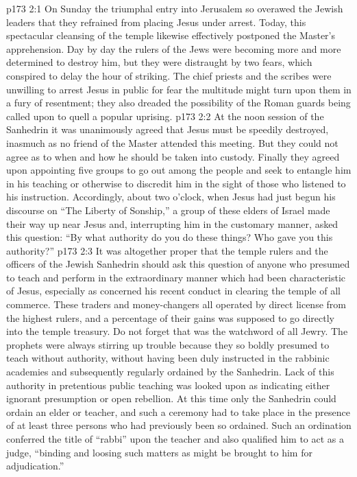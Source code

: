 \vs p173 2:1 On Sunday the triumphal entry into Jerusalem so overawed the Jewish leaders that they refrained from placing Jesus under arrest. Today, this spectacular cleansing of the temple likewise effectively postponed the Master’s apprehension. Day by day the rulers of the Jews were becoming more and more determined to destroy him, but they were distraught by two fears, which conspired to delay the hour of striking. The chief priests and the scribes were unwilling to arrest Jesus in public for fear the multitude might turn upon them in a fury of resentment; they also dreaded the possibility of the Roman guards being called upon to quell a popular uprising.
\vs p173 2:2 At the noon session of the Sanhedrin it was unanimously agreed that Jesus must be speedily destroyed, inasmuch as no friend of the Master attended this meeting. But they could not agree as to when and how he should be taken into custody. Finally they agreed upon appointing five groups to go out among the people and seek to entangle him in his teaching or otherwise to discredit him in the sight of those who listened to his instruction. Accordingly, about two o’clock, when Jesus had just begun his discourse on “The Liberty of Sonship,” a group of these elders of Israel made their way up near Jesus and, interrupting him in the customary manner, asked this question: “By what authority do you do these things? Who gave you this authority?”
\vs p173 2:3 It was altogether proper that the temple rulers and the officers of the Jewish Sanhedrin should ask this question of anyone who presumed to teach and perform in the extraordinary manner which had been characteristic of Jesus, especially as concerned his recent conduct in clearing the temple of all commerce. These traders and money\hyp{}changers all operated by direct license from the highest rulers, and a percentage of their gains was supposed to go directly into the temple treasury. Do not forget that  was the watchword of all Jewry. The prophets were always stirring up trouble because they so boldly presumed to teach without authority, without having been duly instructed in the rabbinic academies and subsequently regularly ordained by the Sanhedrin. Lack of this authority in pretentious public teaching was looked upon as indicating either ignorant presumption or open rebellion. At this time only the Sanhedrin could ordain an elder or teacher, and such a ceremony had to take place in the presence of at least three persons who had previously been so ordained. Such an ordination conferred the title of “rabbi” upon the teacher and also qualified him to act as a judge, “binding and loosing such matters as might be brought to him for adjudication.”
